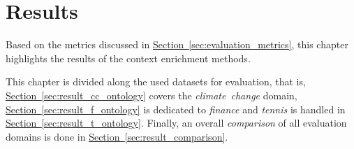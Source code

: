 \chapter{Results}\label{chap:results}
Based on the metrics discussed in \hyperref[sec:evaluation_metrics]{Section~\ref*{sec:evaluation_metrics}}, this chapter highlights the results of the context enrichment methods.

This chapter is divided along the used datasets for evaluation, that is, \hyperref[sec:result_cc_ontology]{Section~\ref*{sec:result_cc_ontology}} covers the \emph{climate~change} domain, \hyperref[sec:result_f_ontology]{Section~\ref*{sec:result_f_ontology}} is dedicated to \emph{finance} and \emph{tennis} is handled in \hyperref[sec:result_t_ontology]{Section~\ref*{sec:result_t_ontology}}. Finally, an overall \emph{comparison} of all evaluation domains is done in \hyperref[sec:result_comparison]{Section~\ref*{sec:result_comparison}}.











